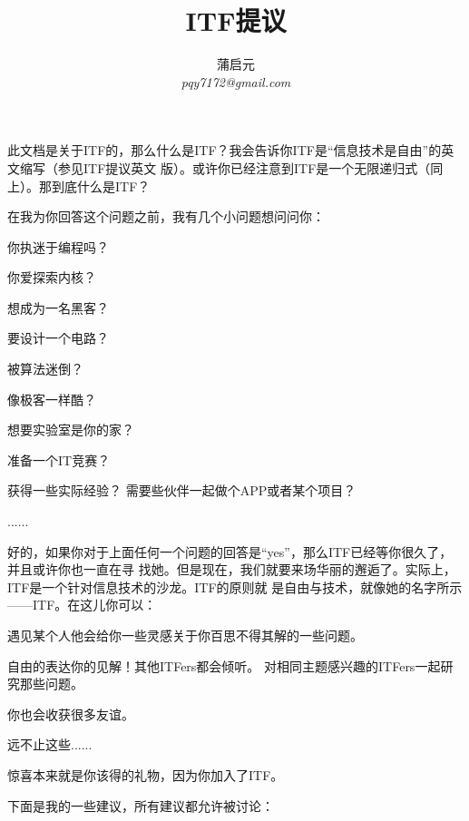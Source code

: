 \documentclass[12pt,a4paper]{article}
\begin{document}
\title{ITF提议}
\author{蒲启元\\
  \emph{pqy7172@gmail.com}}
\maketitle{}
此文档是关于ITF的，那么什么是ITF？我会告诉你ITF是“信息技术是自由”的英文缩写（参见ITF提议英文
版）。或许你已经注意到ITF是一个无限递归式（同上）。那到底什么是ITF？

在我为你回答这个问题之前，我有几个小问题想问问你：
\begin{center}
  你执迷于编程吗？
  
  你爱探索内核？
  
  想成为一名黑客？
  
  要设计一个电路？
  
  被算法迷倒？
  
  像极客一样酷？
  
  想要实验室是你的家？
  
  准备一个IT竞赛？
  
  获得一些实际经验？
  需要些伙伴一起做个APP或者某个项目？
  
  ......
\end{center}

好的，如果你对于上面任何一个问题的回答是“yes”，那么ITF已经等你很久了，并且或许你也一直在寻
找她。但是现在，我们就要来场华丽的邂逅了。实际上，ITF是一个针对信息技术的沙龙。ITF的原则就
是自由与技术，就像她的名字所示——ITF。在这儿你可以：

\begin{center}
  遇见某个人他会给你一些灵感关于你百思不得其解的一些问题。
  
  自由的表达你的见解！其他ITFers都会倾听。
  对相同主题感兴趣的ITFers一起研究那些问题。
  
  你也会收获很多友谊。
  
  远不止这些......
  
  惊喜本来就是你该得的礼物，因为你加入了ITF。
  
\end{center}

下面是我的一些建议，所有建议都允许被讨论：
\end{document}

